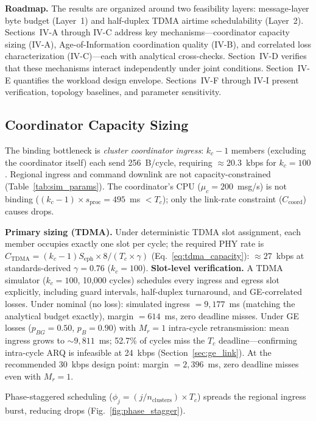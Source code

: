 \documentclass[journal]{IEEEtran}
\begin{document}
\textbf{Roadmap.} The results are organized around two feasibility layers: message-layer byte budget (Layer~1) and half-duplex TDMA airtime schedulability (Layer~2). Sections~IV-A through IV-C address key mechanisms---coordinator capacity sizing (IV-A), Age-of-Information coordination quality (IV-B), and correlated loss characterization (IV-C)---each with analytical cross-checks. Section~IV-D verifies that these mechanisms interact independently under joint conditions. Section~IV-E quantifies the workload design envelope. Sections~IV-F through IV-I present verification, topology baselines, and parameter sensitivity.

\subsection{Coordinator Capacity Sizing}
\label{sec:coordinator_bandwidth}

The binding bottleneck is \emph{cluster coordinator ingress}: $k_c - 1$ members (excluding the coordinator itself) each send 256~B/cycle, requiring ${\approx}20.3$~kbps for $k_c = 100$. Regional ingress and command downlink are not capacity-constrained (Table~\ref{tab:sim_params}). The coordinator's CPU ($\mu_c = 200$~msg/s) is not binding ($(k_c - 1) \times s_{\text{proc}} = 495$~ms $< T_c$); only the link-rate constraint ($C_{\text{coord}}$) causes drops.

\textbf{Primary sizing (TDMA).} Under deterministic TDMA slot assignment, each member occupies exactly one slot per cycle; the required PHY rate is $C_{\text{TDMA}} = (k_c - 1) S_{\text{eph}} \times 8 / (T_c \times \gamma)$ (Eq.~\ref{eq:tdma_capacity}): ${\approx}27$~kbps at standards-derived $\gamma = 0.76$ ($k_c = 100$). \textbf{Slot-level verification.} A TDMA simulator ($k_c = 100$, 10{,}000 cycles) schedules every ingress and egress slot explicitly, including guard intervals, half-duplex turnaround, and GE-correlated losses. Under nominal (no loss): simulated ingress $= 9{,}177$~ms (matching the analytical budget exactly), margin $= 614$~ms, zero deadline misses. Under GE losses ($p_{BG} = 0.50$, $p_B = 0.90$) with $M_r = 1$ intra-cycle retransmission: mean ingress grows to ${\sim}9{,}811$~ms; 52.7\% of cycles miss the $T_c$ deadline---confirming intra-cycle ARQ is infeasible at 24~kbps (Section~\ref{sec:ge_link}). At the recommended 30~kbps design point: margin $= 2{,}396$~ms, zero deadline misses even with $M_r = 1$.

Phase-staggered scheduling ($\phi_j = (j / n_{\text{clusters}}) \times T_c$) spreads the regional ingress burst, reducing drops (Fig.~\ref{fig:phase_stagger}).
\end{document}
